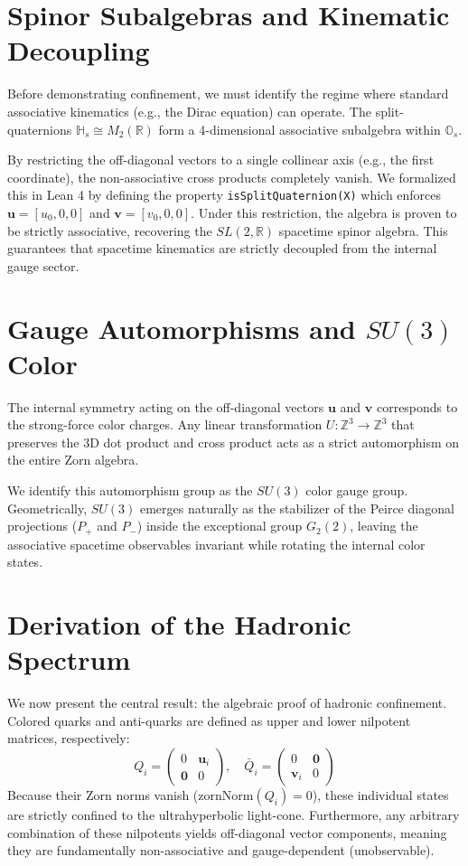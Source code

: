 \section{Spinor Subalgebras and Kinematic Decoupling}

Before demonstrating confinement, we must identify the regime where standard associative kinematics (e.g., the Dirac equation) can operate. The split-quaternions $\mathbb{H}_s \cong M_2(\mathbb{R})$ form a 4-dimensional associative subalgebra within $\mathbb{O}_s$. 

By restricting the off-diagonal vectors to a single collinear axis (e.g., the first coordinate), the non-associative cross products completely vanish. We formalized this in Lean 4 by defining the property \texttt{isSplitQuaternion(X)} which enforces $\mathbf{u} = [u_0, 0, 0]$ and $\mathbf{v} = [v_0, 0, 0]$. Under this restriction, the algebra is proven to be strictly associative, recovering the $SL(2, \mathbb{R})$ spacetime spinor algebra. This guarantees that spacetime kinematics are strictly decoupled from the internal gauge sector.

\section{Gauge Automorphisms and $SU(3)$ Color}

The internal symmetry acting on the off-diagonal vectors $\mathbf{u}$ and $\mathbf{v}$ corresponds to the strong-force color charges. Any linear transformation $U: \mathbb{Z}^3 \to \mathbb{Z}^3$ that preserves the 3D dot product and cross product acts as a strict automorphism on the entire Zorn algebra. 

We identify this automorphism group as the $SU(3)$ color gauge group. Geometrically, $SU(3)$ emerges naturally as the stabilizer of the Peirce diagonal projections ($P_+$ and $P_-$) inside the exceptional group $G_2(2)$, leaving the associative spacetime observables invariant while rotating the internal color states.

\section{Derivation of the Hadronic Spectrum}

We now present the central result: the algebraic proof of hadronic confinement. Colored quarks and anti-quarks are defined as upper and lower nilpotent matrices, respectively:
\begin{equation}
Q_i = \begin{pmatrix} 0 & \mathbf{u}_i \\ \mathbf{0} & 0 \end{pmatrix}, \quad \bar{Q}_i = \begin{pmatrix} 0 & \mathbf{0} \\ \mathbf{v}_i & 0 \end{pmatrix}
\end{equation}
Because their Zorn norms vanish ($\text{zornNorm}(Q_i) = 0$), these individual states are strictly confined to the ultrahyperbolic light-cone. Furthermore, any arbitrary combination of these nilpotents yields off-diagonal vector components, meaning they are fundamentally non-associative and gauge-dependent (unobservable). 

